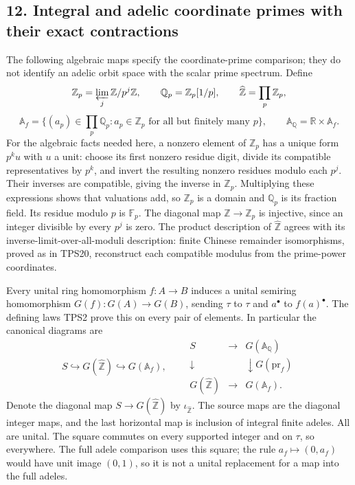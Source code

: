 \documentclass[
  10pt,
]{article}
\begin{document}
\subsection{12. Integral and adelic coordinate primes with their exact
contractions}\label{integral-and-adelic-coordinate-primes-with-their-exact-contractions}

The following algebraic maps specify the coordinate-prime comparison;
they do not identify an adelic orbit space with the scalar prime
spectrum. Define \[
\mathbb Z_p=\varprojlim_j\mathbb Z/p^j\mathbb Z,\qquad
\mathbb Q_p=\mathbb Z_p[1/p],\qquad
\widehat{\mathbb Z}=\prod_p\mathbb Z_p,
\] \[
\mathbb A_f=\{(a_p)\in\prod_p\mathbb Q_p:a_p\in\mathbb Z_p
\text{ for all but finitely many }p\},\qquad
\mathbb A_{\mathbb Q}=\mathbb R\times\mathbb A_f.
\tag{TPS53}
\] For the algebraic facts needed here, a nonzero element of
\(\mathbb Z_p\) has a unique form \(p^k u\) with \(u\) a unit: choose
its first nonzero residue digit, divide its compatible representatives
by \(p^k\), and invert the resulting nonzero residues modulo each
\(p^j\). Their inverses are compatible, giving the inverse in
\(\mathbb Z_p\). Multiplying these expressions shows that valuations
add, so \(\mathbb Z_p\) is a domain and \(\mathbb Q_p\) is its fraction
field. Its residue modulo \(p\) is \(\mathbb F_p\). The diagonal map
\(\mathbb Z\to\mathbb Z_p\) is injective, since an integer divisible by
every \(p^j\) is zero. The product description of
\(\widehat{\mathbb Z}\) agrees with its inverse-limit-over-all-moduli
description: finite Chinese remainder isomorphisms, proved as in TPS20,
reconstruct each compatible modulus from the prime-power coordinates.

Every unital ring homomorphism \(f:A\to B\) induces a unital semiring
homomorphism \(G(f):G(A)\to G(B)\), sending \(\tau\) to \(\tau\) and
\(a^\bullet\) to \(f(a)^\bullet\). The defining laws TPS2 prove this on
every pair of elements. In particular the canonical diagrams are \[
S\hookrightarrow G(\widehat{\mathbb Z})\hookrightarrow G(\mathbb A_f),
\qquad
\begin{array}{ccc}
S&\longrightarrow&G(\mathbb A_{\mathbb Q})\\
\downarrow&&\downarrow\scriptstyle G(\mathrm{pr}_f)\\
G(\widehat{\mathbb Z})&\longrightarrow&G(\mathbb A_f).
\end{array}
\tag{TPS54}
\] Denote the diagonal map \(S\to G(\widehat{\mathbb Z})\) by
\(\iota_{\widehat{\mathbb Z}}\). The source maps are the diagonal
integer maps, and the last horizontal map is inclusion of integral
finite adeles. All are unital. The square commutes on every supported
integer and on \(\tau\), so everywhere. The full adele comparison uses
this square; the rule \(a_f\mapsto(0,a_f)\) would have unit image
\((0,1)\), so it is not a unital replacement for a map into the full
adeles.
\end{document}
